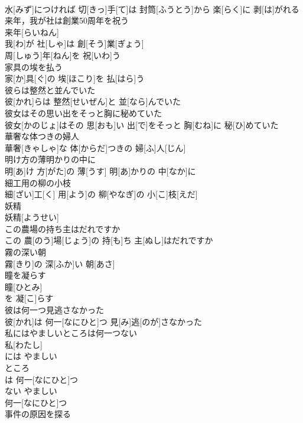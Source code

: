 \documentclass[8pt]{extreport}
\begin{document}
\begin{CJK}{UTF8}{min}
\\	水[みず]につければ 切[きっ]手[て]は 封筒[ふうとう]から 楽[らく]に 剥[は]がれる
\\	来年，我が社は創業50周年を祝う	
\\	来年[らいねん]
\\	我[わ]が 社[しゃ]は 創[そう]業[ぎょう]
\\	周[しゅう]年[ねん]を 祝[いわ]う 
\\	家具の埃を払う	
\\	家[か]具[ぐ]の 埃[ほこり]を 払[はら]う
\\	彼らは整然と並んでいた	
\\	彼[かれ]らは 整然[せいぜん]と 並[なら]んでいた
\\	彼女はその思い出をそっと胸に秘めていた	
\\	彼女[かのじょ]はその 思[おも]い 出[で]をそっと 胸[むね]に 秘[ひ]めていた
\\	華奢な体つきの婦人	
\\	華奢[きゃしゃ]な 体[からだ]つきの 婦[ふ]人[じん]
\\	明け方の薄明かりの中に	
\\	明[あ]け 方[がた]の 薄[うす] 明[あ]かりの 中[なか]に
\\	細工用の柳の小枝	
\\	細[ざい]工[く] 用[よう]の 柳[やなぎ]の 小[こ]枝[えだ]
\\	妖精	
\\	妖精[ようせい]
\\	この農場の持ち主はだれですか	
\\	この 農[のう]場[じょう]の 持[も]ち 主[ぬし]はだれですか
\\	霧の深い朝	
\\	霧[きり]の 深[ふか]い 朝[あさ]
\\	瞳を凝らす	
\\	瞳[ひとみ]
\\	を 凝[こ]らす 
\\	彼は何一つ見逃さなかった	
\\	彼[かれ]は 何一[なにひと]つ 見[み]逃[のが]さなかった
\\	私にはやましいところは何一つない	
\\	私[わたし]
\\	には やましい 
\\	ところ 
\\	は 何一[なにひと]つ 
\\	ない やましい 
\\	何一[なにひと]つ 
\\	事件の原因を探る	

\end{CJK}
\end{document}
